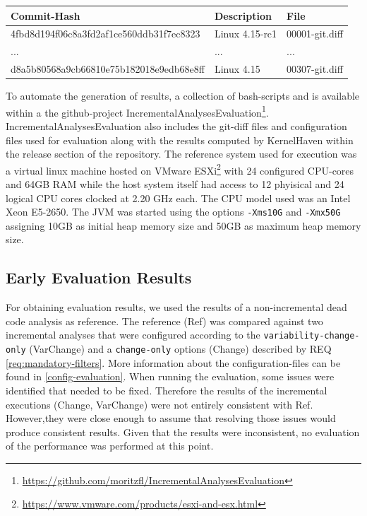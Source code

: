\documentclass[a4paper]{article}
\begin{document}
\begin{tabular}{l | l | l}
	Commit-Hash & Description & File \\ \hline
	4fbd8d194f06c8a3fd2af1ce560ddb31f7ec8323 & Linux 4.15-rc1 & 00001-git.diff \\
	... & ... & ... \\
	d8a5b80568a9cb66810e75b182018e9edb68e8ff & Linux 4.15  & 00307-git.diff \\
\end{tabular}

To automate the generation of results, a collection of bash-scripts and is available within a the github-project Incremental\-Analyses\-Evaluation\footnote{\url{https://github.com/moritzfl/IncrementalAnalysesEvaluation}}. Incremental\-Analyses\-Evaluation also includes the git-diff files and  configuration files used for evaluation along with the results computed by KernelHaven within the release section of the repository. The reference system used for execution was a virtual linux machine hosted on VMware ESXi\footnote{\url{https://www.vmware.com/products/esxi-and-esx.html}} with 24 configured CPU-cores and 64GB RAM while the host system itself had access to 12 phyisical and 24 logical CPU cores clocked at 2.20 GHz each. The CPU model used was an Intel Xeon E5-2650. The JVM was started using the options \texttt{-Xms10G} and \texttt{-Xmx50G} assigning 10GB as initial heap memory size and 50GB as maximum heap memory size.

\subsection{Early Evaluation Results} \label{early-evaluation-results}

For obtaining evaluation results, we used the results of a non-incremental dead code analysis as reference.  The reference (Ref) was compared against two incremental analyses that were configured according to the \texttt{variability-change-only} (VarChange) and a \texttt{change-only} options (Change) described by REQ \ref{req:mandatory-filters}. More information about the configuration-files can be found in \autoref{config-evaluation}.
When running the evaluation, some issues were identified that needed to be fixed. Therefore the results of the incremental executions (Change, VarChange) were not entirely consistent with Ref. However,they were close enough to assume that resolving those issues would produce consistent results. Given that the results were inconsistent, no evaluation of the performance was performed at this point.
\end{document}
